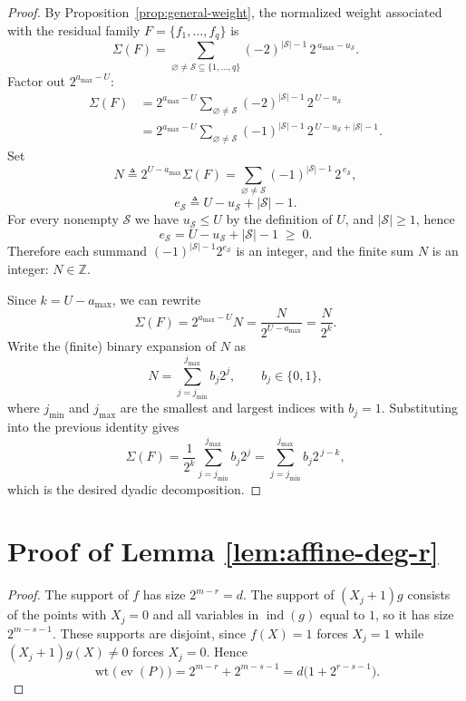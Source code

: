 \documentclass[conference]{IEEEtran}
\theoremstyle{definition}
\newcommand{\wt}{\operatorname{wt}}
\newcommand{\ind}{\operatorname{ind}}
\newcommand{\ev}{\operatorname{ev}}
\begin{document}
\begin{proof}
By Proposition~\ref{prop:general-weight}, the normalized weight associated
with the residual family $F=\{f_1,\dots,f_q\}$ is
\[
\Sigma(F)
=
\sum_{\varnothing\neq\mathcal S\subseteq\{1,\dots,q\}}
(-2)^{|\mathcal S|-1}\,2^{\,a_{\max}-u_{\mathcal S}}.
\]
Factor out $2^{a_{\max}-U}$:
\begin{align*}
\Sigma(F)
&=
2^{a_{\max}-U}
\sum_{\varnothing\neq\mathcal S}
(-2)^{|\mathcal S|-1}\,2^{\,U-u_{\mathcal S}}\\
&=
2^{a_{\max}-U}
\sum_{\varnothing\neq\mathcal S}
(-1)^{|\mathcal S|-1}\,2^{\,U-u_{\mathcal S}+|\mathcal S|-1}.
\end{align*}
Set
\[
N \triangleq 2^{U-a_{\max}}\Sigma(F)
=
\sum_{\varnothing\neq\mathcal S}
(-1)^{|\mathcal S|-1}\,2^{\,e_{\mathcal S}},
\]
\[
e_{\mathcal S} \triangleq U-u_{\mathcal S}+|\mathcal S|-1.
\]
For every nonempty $\mathcal S$ we have $u_{\mathcal S}\le U$ by the
definition of $U$, and $|\mathcal S|\ge1$, hence
\[
e_{\mathcal S}=U-u_{\mathcal S}+|\mathcal S|-1 \;\ge\; 0.
\]
Therefore each summand $(-1)^{|\mathcal S|-1}2^{e_{\mathcal S}}$ is an
integer, and the finite sum $N$ is an integer:
$N\in\mathbb{Z}$.

Since $k=U-a_{\max}$, we can rewrite
\[
\Sigma(F) = 2^{a_{\max}-U} N = \frac{N}{2^{U-a_{\max}}}
= \frac{N}{2^k}.
\]
Write the (finite) binary expansion of $N$ as
\[
N = \sum_{j=j_{\min}}^{j_{\max}} b_j 2^j,
\qquad b_j\in\{0,1\},
\]
where $j_{\min}$ and $j_{\max}$ are the smallest and largest indices
with $b_j=1$. Substituting into the previous identity gives
\[
\Sigma(F)
=
\frac{1}{2^k}\sum_{j=j_{\min}}^{j_{\max}} b_j 2^j
=
\sum_{j=j_{\min}}^{j_{\max}} b_j 2^{\,j-k},
\]
which is the desired dyadic decomposition.
\end{proof}

\section{Proof of Lemma \ref{lem:affine-deg-r}}

\begin{proof}
The support of $f$ has size $2^{m-r}=d$. The support of $(X_j+1)g$ consists of
the points with $X_j=0$ and all variables in $\ind(g)$ equal to $1$, so it has
size $2^{m-s-1}$. These supports are disjoint, since $f(X)=1$ forces $X_j=1$
while $(X_j+1)g(X)\neq 0$ forces $X_j=0$. Hence
\[
\wt\bigl(\ev(P)\bigr)
= 2^{m-r}+2^{m-s-1}
= d\bigl(1+2^{r-s-1}\bigr).
\]
\end{proof}
\end{document}
